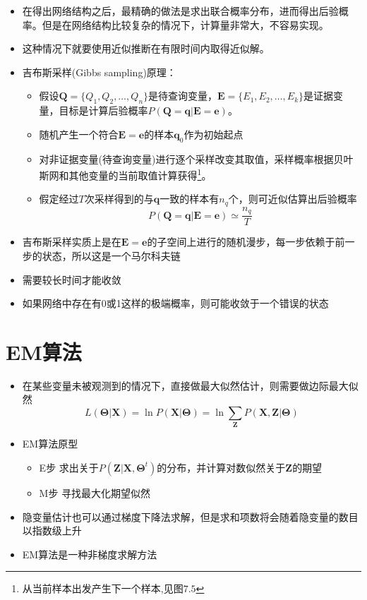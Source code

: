 \begin{itemize}
\item 在得出网络结构之后，最精确的做法是求出联合概率分布，进而得出后验概率。但是在网络结构比较复杂的情况下，计算量非常大，不容易实现。
\item 这种情况下就要使用近似推断在有限时间内取得近似解。
\item 吉布斯采样(Gibbs sampling)原理：
    \begin{itemize}
    \item 假设$\mathbf Q=\{Q_1,Q_2,\dots,Q_n\}$是待查询变量，$\mathbf E=\{E_1,E_2,\dots,E_k\}$是证据变量，目标是计算后验概率$P(\mathbf{Q}=\bm q|\mathbf{E}=\bm e)$。
    \item 随机产生一个符合$\mathbf E=\bm{e}$的样本$\bm q_0$作为初始起点
    \item 对非证据变量(待查询变量)进行逐个采样改变其取值，采样概率根据贝叶斯网和其他变量的当前取值计算获得\footnote{从当前样本出发产生下一个样本,见图$7.5$}。
    \item 假定经过$T$次采样得到的与$\bm{q}$一致的样本有$n_q$个，则可近似估算出后验概率\begin{equation}P(\mathbf{Q}=\bm q|\mathbf{E}=\bm e)\simeq \frac{n_q}{T}\end{equation}
    \end{itemize}
\item 吉布斯采样实质上是在$\mathbf E=\bm{e}$的子空间上进行的随机漫步，每一步依赖于前一步的状态，所以这是一个马尔科夫链
    \item 需要较长时间才能收敛
    \item 如果网络中存在有0或1这样的极端概率，则可能收敛于一个错误的状态
\end{itemize}

\section{EM算法}

\begin{itemize}
\item 在某些变量未被观测到的情况下，直接做最大似然估计，则需要做边际最大似然\begin{equation}L(\bm\Theta|\mathbf X)=\ln P(\mathbf X|\bm\Theta)=\ln \sum_{\mathbf Z}P(\mathbf{X,Z}|\bm\Theta)\end{equation}
\item EM算法原型
    \begin{itemize}
    \item E步 求出关于$P(\mathbf Z|\mathbf X,\bm\Theta^t)$的分布，并计算对数似然关于$\bm{Z}$的期望
    \item M步 寻找最大化期望似然
    \end{itemize}
\item 隐变量估计也可以通过梯度下降法求解，但是求和项数将会随着隐变量的数目以指数级上升
\item EM算法是一种非梯度求解方法
\end{itemize}
